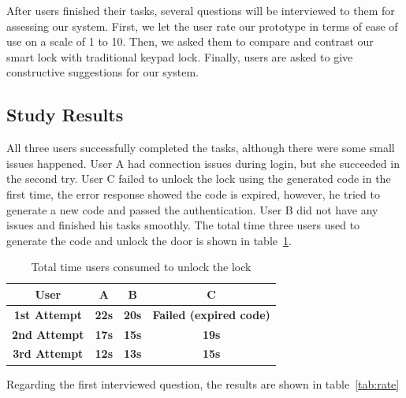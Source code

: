 \documentclass[conference]{IEEEtran}
\begin{document}
After users finished their tasks, several questions will be interviewed to them for assessing our system. First, we let the user rate our prototype in terms of ease of use on a scale of 1 to 10. Then, we asked them to compare and contrast our smart lock with traditional keypad lock.  Finally, users are asked to give constructive suggestions for our system.

\subsection{Study Results}
All three users successfully completed the tasks, although there were some small issues happened. User A had connection issues during login, but she succeeded in the second try. User C failed to unlock the lock using the generated code in the first time, the error response showed the code is expired, however, he tried to generate a new code and passed the authentication. User B did not have any issues and finished his tasks smoothly. The total time three users used to generate the code and unlock the door is shown in table~\ref{tab:time}.

\begin{table}[htbp]
\caption{Total time users consumed to unlock the lock}
\begin{center}
\begin{tabular}{|c|c|c|c|}
\hline
\textbf{User}&\textbf{A}&\textbf{B}&\textbf{C} \\
\hline
\textbf{1st Attempt} & \textbf{22s} & \textbf{20s} & \textbf{Failed (expired code)} \\
\hline
\textbf{2nd Attempt} & \textbf{17s} & \textbf{15s} & \textbf{19s} \\
\hline
\textbf{3rd Attempt} & \textbf{12s} & \textbf{13s} & \textbf{15s}  \\
\hline
\end{tabular}
\label{tab:time}
\end{center}
\end{table}
Regarding the first interviewed question, the results are shown in table~\ref{tab:rate}
\end{document}

